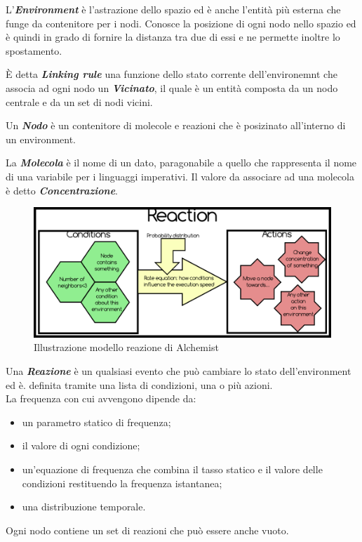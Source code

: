 \documentclass[12pt,a4paper,openright,twoside]{report}
\begin{document}
L'\textbf{\textit{Environment}} \`e l'astrazione dello spazio ed \`e anche l'entit\`a pi\`u esterna che funge da contenitore per i nodi. Conosce la posizione di ogni nodo nello spazio ed \`e quindi in grado di fornire la distanza tra due di essi e ne permette inoltre lo spostamento.

\`E detta \textbf{\textit{Linking rule}} una funzione dello stato corrente dell'environemnt che associa ad ogni nodo un \textbf{\textit{Vicinato}}, il quale \`e un entit\`a composta da un nodo centrale e da un set di nodi vicini.

Un \textbf{\textit{Nodo}} \`e un contenitore di molecole e reazioni che \`e posizinato all'interno di un environment.

La \textbf{\textit{Molecola}} \`e il nome di un dato, paragonabile a quello che rappresenta il nome di una variabile per i linguaggi imperativi.
Il valore da associare ad una molecola \`e detto \textbf{\textit{Concentrazione}}.

\begin{figure}[h] %
\begin{center} %
\includegraphics[width=14cm]{images/reaction.png} %
\caption[Illustrazione modello reazione di Alchemist]{Illustrazione modello reazione di Alchemist} \label{fig:alchemistReaction}
\end{center}
\end{figure}

Una \textbf{\textit{Reazione}} \`e un qualsiasi evento che pu\`o cambiare lo stato dell'environment ed \`e. definita tramite una lista di condizioni, una o pi\`u azioni.
\\La frequenza con cui avvengono dipende da:
\begin{itemize}
\item un parametro statico di frequenza;
\item il valore di ogni condizione;
\item un'equazione di frequenza che combina il tasso statico e il valore delle condizioni restituendo la frequenza istantanea;
\item una distribuzione temporale.
\end{itemize}
Ogni nodo contiene un set di reazioni che pu\`o essere anche vuoto.
\end{document}
